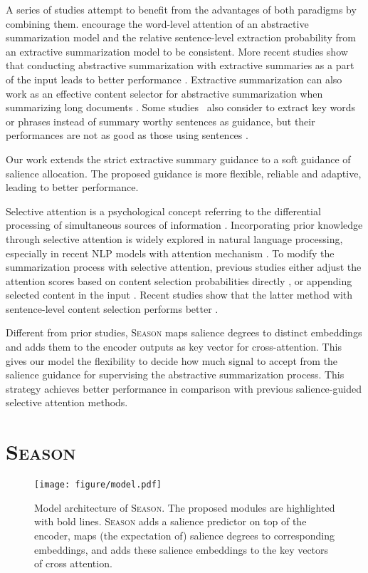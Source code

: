 \documentclass[11pt]{article}
\newcommand{\stitle}[1]{\vspace{1ex} \noindent{\bf #1.}}
\newcommand{\MODEL}{\mbox{\textsc{Season}}\xspace}
\newcommand{\FIGUREMODEL}{
    \begin{figure}[t]
      \begin{center}
        \texttt{[image: figure/model.pdf]} \end{center}
          \caption{Model architecture of \MODEL. The proposed modules are highlighted with bold lines. \MODEL adds a salience predictor on top of the encoder, maps (the expectation of) salience degrees to corresponding embeddings, and adds these salience embeddings to the key vectors of cross attention.}
      
      \label{fig:model}
      \vspace{-0.5em}
    \end{figure}
}
\begin{document}
A series of studies attempt to benefit from the advantages of both paradigms by combining them. \citet{hsu2018unified} encourage the word-level attention of an abstractive summarization model and the relative sentence-level extraction probability from an extractive summarization model to be consistent. More recent studies show that conducting abstractive summarization with extractive summaries as a part of the input leads to better performance \cite{saito2020abstractive,pilault2020extractive,dou2021gsum}. 
Extractive summarization can also work as an effective content selector for abstractive summarization when summarizing long documents \cite{manakul2021long}. 
Some studies~\cite{gehrmann2018bottom,li2020keywords,saito2020abstractive} also consider to extract key words or phrases instead of summary worthy sentences as guidance, but their performances are not as good as those using sentences \cite{dou2021gsum}.

Our work extends the strict extractive summary guidance to a soft guidance of salience allocation. The proposed guidance is more flexible, reliable and adaptive, leading to better performance.  


\stitle{Selective attention}
Selective attention is a psychological concept referring to the differential processing of simultaneous sources of information \cite{johnston1986selective}.
Incorporating prior knowledge through selective attention is widely explored in natural language processing, especially in recent NLP models with attention mechanism \cite{lin2016neural,sukhbaatar2019adaptive,pruthi2020learning,Beltagy2020Longformer,wang2022robust}.
To modify the summarization process with selective attention,
previous studies either adjust the attention scores based on content selection probabilities directly \cite{hsu2018unified,saito2020abstractive,li2021ease}, or appending selected content in the input \cite{saito2020abstractive,dou2021gsum}.
Recent studies show that the latter method with sentence-level content selection performs better \cite{dou2021gsum}.

Different from prior studies, \MODEL maps salience degrees to distinct embeddings and adds them to the encoder outputs as key vector for cross-attention.
This gives our model the flexibility to decide how much signal to accept from the salience guidance for supervising the abstractive summarization process.
This strategy achieves better performance 
in comparison with previous salience-guided selective attention methods.
 \section{\MODEL}\label{sec:method}
\FIGUREMODEL
\end{document}
